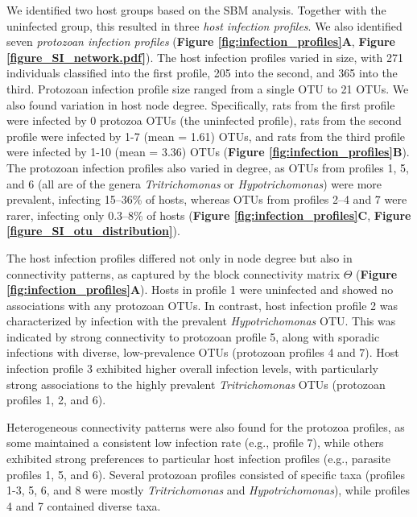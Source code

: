\documentclass[oneside, a4paper, onecolumn, 11pt]{article}
\begin{document}
We identified two host groups based on the SBM analysis. Together with the uninfected group, this resulted in three \textit{host infection profiles}. We also identified seven \textit{protozoan infection profiles} (\textbf{Figure \ref{fig:infection_profiles}A}, \textbf{Figure \ref{figure_SI_network.pdf}}). The host infection profiles varied in size, with 271 individuals classified into the first profile, 205 into the second, and 365 into the third. Protozoan infection profile size ranged from a single OTU to 21 OTUs. We also found variation in host node degree. Specifically, rats from the first profile were infected by 0 protozoa OTUs (the uninfected profile), rats from the second profile were infected by 1-7 (mean = 1.61) OTUs, and rats from the third profile were infected by 1-10 (mean = 3.36) OTUs (\textbf{Figure \ref{fig:infection_profiles}B}). The protozoan infection profiles also varied in degree, as OTUs from profiles 1, 5, and 6 (all are of the genera \textit{Tritrichomonas} or \textit{Hypotrichomonas}) were more prevalent, infecting 15–36\% of hosts, whereas OTUs from profiles 2–4 and 7 were rarer, infecting only 0.3–8\% of hosts (\textbf{Figure \ref{fig:infection_profiles}C}, \textbf{Figure \ref{figure_SI_otu_distribution}}). 

The host infection profiles differed not only in node degree but also in connectivity patterns, as captured by the block connectivity matrix $\Theta$ (\textbf{Figure \ref{fig:infection_profiles}A}). Hosts in profile 1 were uninfected and showed no associations with any protozoan OTUs. In contrast, host infection profile 2 was characterized by infection with the prevalent \textit{Hypotrichomonas} OTU. This was indicated by strong connectivity to protozoan profile 5, along with sporadic infections with diverse, low-prevalence OTUs (protozoan profiles 4 and 7). Host infection profile 3 exhibited higher overall infection levels, with particularly strong associations to the highly prevalent \textit{Tritrichomonas} OTUs (protozoan profiles 1, 2, and 6). 

Heterogeneous connectivity patterns were also found for the protozoa profiles, as some maintained a consistent low infection rate (e.g., profile 7), while others exhibited strong preferences to particular host infection profiles (e.g., parasite profiles 1, 5, and 6). Several protozoan profiles consisted of specific taxa (profiles 1-3, 5, 6, and 8 were mostly \textit{Tritrichomonas} and \textit{Hypotrichomonas}), while profiles 4 and 7 contained diverse taxa. 
\end{document}
